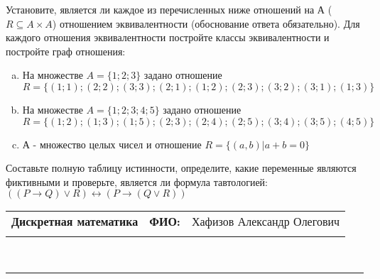 \documentclass[10pt]{exam}
\newcommand{\class}{Дискретная математика}
\newcommand{\examdate}{}
\begin{document}
\begin{questions}
\question
Установите, является ли каждое из перечисленных ниже отношений на А ($R \subseteq A \times A$) отношением эквивалентности (обоснование ответа обязательно). Для каждого отношения эквивалентности постройте классы 
эквивалентности и постройте граф отношения:
\begin{enumerate} [a)]\setcounter{enumi}{0}
\item На множестве $A = \{1; 2; 3\}$ задано отношение $R = \{(1; 1); (2; 2); (3; 3); (2; 1); (1; 2); (2; 3); (3; 2); (3; 1); (1; 3)\}$
\item На множестве $A = \{1; 2; 3; 4; 5\}$ задано отношение $R = \{(1; 2); (1; 3); (1; 5); (2; 3); (2; 4); (2; 5); (3; 4); (3; 5); (4; 5)\}$
\item А - множество целых чисел и отношение $R = \{(a,b)|a + b = 0\}$
\end{enumerate}\question Составьте полную таблицу истинности, определите, какие переменные являются фиктивными и проверьте, является ли формула тавтологией:
$((P \rightarrow Q) \lor R) \leftrightarrow (P \rightarrow (Q \lor R))$

\end{questions}
\newpage
\begin{flushright}
\begin{tabular}{p{2.8in} r l}
\textbf{\class} & \textbf{ФИО:} &Хафизов Александр Олегович
\\

\textbf{\examdate} &&\\
\end{tabular}\\
\end{flushright}
\rule[1ex]{\textwidth}{.1pt}
\end{document}
